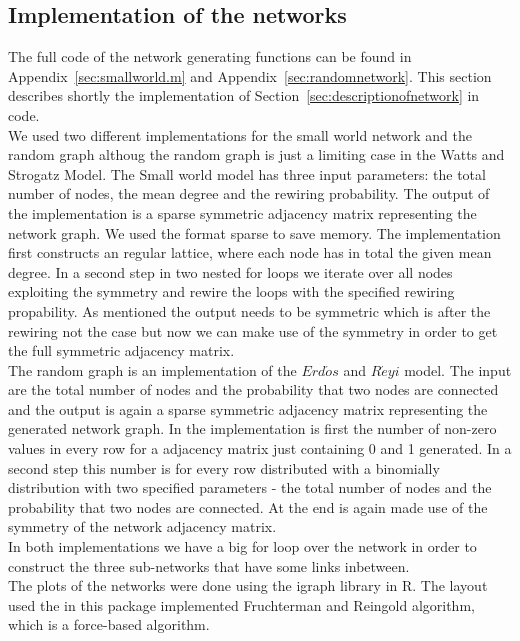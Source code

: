 \subsection{Implementation of the networks}
\label{sec:implementationofnetworks}

The full code of the network generating functions can be found in
Appendix~\ref{sec:smallworld.m} and Appendix~\ref{sec:randomnetwork}. This section describes shortly the implementation of Section~\ref{sec:descriptionofnetwork} in \matlab code. \\

We used two different implementations for the small world network and the random graph althoug the random graph is just a limiting case in the Watts and Strogatz Model. The Small world model has three input parameters: the total number of nodes, the mean degree and the rewiring probability. The output of the implementation is a sparse symmetric adjacency matrix representing the network graph. We used the format sparse to save memory. The implementation first constructs an regular lattice, where each node has in total the given mean degree. In a second step in two nested for loops we iterate over all nodes exploiting the symmetry and rewire the loops with the specified rewiring propability. As mentioned the output needs to be symmetric which is after the rewiring not the case but now we can make use of the symmetry in order to get the full symmetric adjacency matrix.\\

The random graph is an implementation of the $Erd\acute{o}s$ and $R\acute{e}yi$ model. The input are the total number of nodes and the probability that two nodes are connected and the output is again a sparse symmetric adjacency matrix representing the generated network graph. In the implementation is first the number of non-zero values in every row for a adjacency matrix just containing 0 and 1 generated. In a second step this number is for every row distributed with a binomially distribution with two specified parameters - the total number of nodes and the probability that two nodes are connected. At the end is again made use of the symmetry of the network adjacency matrix. \\

In both implementations we have a big for loop over the network in order to construct the three sub-networks that have some links inbetween.\\

The plots of the networks were done using the igraph library in R. The layout used the in this package implemented Fruchterman and Reingold algorithm, which is a force-based algorithm.